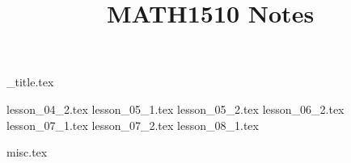 \documentclass{article}
\title{MATH1510 Notes}
\author{}
\date{}
\begin{document}
{_title.tex}

\tableofcontents

{lesson_04_2.tex}
{lesson_05_1.tex}
{lesson_05_2.tex}
{lesson_06_2.tex}
{lesson_07_1.tex}
{lesson_07_2.tex}
{lesson_08_1.tex}

{misc.tex}
\end{document}
